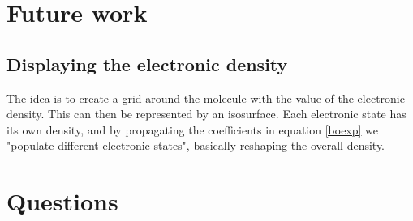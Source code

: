 \section{Future work}
\subsection{Displaying the electronic density}
The idea is to create a grid around the molecule with the value of the electronic density. This can then be represented by an isosurface. Each electronic state has its own density, and by propagating the coefficients in equation \ref{boexp} we "populate different electronic states", basically reshaping the overall density.

\section{Questions}
\pagebreak